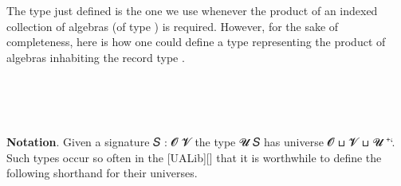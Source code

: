 \ccpad
The type just defined is the one we use whenever the product of an indexed collection of algebras (of type ) is required.  However, for the sake of completeness, here is how one could define a type representing the product of algebras inhabiting the record type .
\ccpad
\begin{code}%
\>[0][@{}l@{\AgdaIndent{0}}]%
\>[1]\AgdaSpace{}%
\<%
\\
\>[1]\AgdaSpace{}%
\AgdaSymbol{:}\AgdaSpace{}%
\AgdaSymbol{(}\AgdaSpace{}%
\AgdaSymbol{:}\AgdaSpace{}%
\AgdaSpace{}%
\AgdaSpace{}%
\AgdaSpace{}%
\AgdaSpace{}%
\AgdaSymbol{)}\AgdaSpace{}%
\AgdaSpace{}%
\AgdaSpace{}%
\AgdaSymbol{(}\AgdaSpace{}%
\AgdaSpace{}%
\AgdaSymbol{)}\AgdaSpace{}%
\<%
\\
%
\>[1]\AgdaSpace{}%
\AgdaSpace{}%
\AgdaSymbol{=}\AgdaSpace{}%
%
\>[100I]\AgdaSymbol{\{}\AgdaSpace{}%
\AgdaSpace{}%
\AgdaSymbol{=}\AgdaSpace{}%
\AgdaSpace{}%
\AgdaSpace{}%
\AgdaSpace{}%
\AgdaSpace{}%
\AgdaSymbol{(}\AgdaSpace{}%
\AgdaSymbol{)}\AgdaSpace{}\AgdaSymbol{;}%
\>[55]\<%
\\
\>[100I][@{}l@{\AgdaIndent{0}}]%
\>[15]\AgdaSpace{}%
\AgdaSymbol{=}\AgdaSpace{}%
\AgdaSpace{}%
\AgdaSpace{}%
\AgdaSpace{}%
\AgdaSpace{}%
\AgdaSpace{}%
\AgdaSymbol{(}\AgdaSpace{}%
\AgdaSymbol{(}\AgdaSpace{}%
\AgdaSymbol{))}\AgdaSpace{}%
\AgdaSpace{}%
\AgdaSpace{}%
\AgdaSpace{}%
\AgdaSpace{}%
\AgdaSpace{}%
\AgdaSpace{}%
\AgdaSpace{}\AgdaSymbol{\}}%
\>[55]\<%
\end{code}
\ccpad
\textbf{Notation}. Given a signature \ab 𝑆 :  \ab 𝓞 \ab 𝓥 the type  \ab 𝓤 \ab 𝑆 has universe 𝓞 ⊔ 𝓥 ⊔ 𝓤 ⁺`.  Such types occur so often in the [UALib][] that it is worthwhile to define the following shorthand for their universes.

